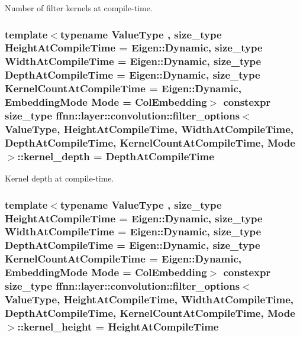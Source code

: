 Number of filter kernels at compile-\/time. 

\hypertarget{structffnn_1_1layer_1_1convolution_1_1filter__options_a3d16412aa799bd8a7357ea581dc33609}{
\subsubsection[{kernel\-\_\-depth}]{\setlength{\rightskip}{0pt plus 5cm}template$<$typename Value\-Type , size\-\_\-type Height\-At\-Compile\-Time = Eigen\-::\-Dynamic, size\-\_\-type Width\-At\-Compile\-Time = Eigen\-::\-Dynamic, size\-\_\-type Depth\-At\-Compile\-Time = Eigen\-::\-Dynamic, size\-\_\-type Kernel\-Count\-At\-Compile\-Time = Eigen\-::\-Dynamic, Embedding\-Mode Mode = Col\-Embedding$>$ constexpr {\bf size\-\_\-type} {\bf ffnn\-::layer\-::convolution\-::filter\-\_\-options}$<$ Value\-Type, Height\-At\-Compile\-Time, Width\-At\-Compile\-Time, Depth\-At\-Compile\-Time, Kernel\-Count\-At\-Compile\-Time, Mode $>$\-::kernel\-\_\-depth = Depth\-At\-Compile\-Time\hspace{0.3cm}{\ttfamily [static]}}}\label{structffnn_1_1layer_1_1convolution_1_1filter__options_a3d16412aa799bd8a7357ea581dc33609}


Kernel depth at compile-\/time. 

\hypertarget{structffnn_1_1layer_1_1convolution_1_1filter__options_a29ea922878c27749a2def9f843ccfaa6}{
\subsubsection[{kernel\-\_\-height}]{\setlength{\rightskip}{0pt plus 5cm}template$<$typename Value\-Type , size\-\_\-type Height\-At\-Compile\-Time = Eigen\-::\-Dynamic, size\-\_\-type Width\-At\-Compile\-Time = Eigen\-::\-Dynamic, size\-\_\-type Depth\-At\-Compile\-Time = Eigen\-::\-Dynamic, size\-\_\-type Kernel\-Count\-At\-Compile\-Time = Eigen\-::\-Dynamic, Embedding\-Mode Mode = Col\-Embedding$>$ constexpr {\bf size\-\_\-type} {\bf ffnn\-::layer\-::convolution\-::filter\-\_\-options}$<$ Value\-Type, Height\-At\-Compile\-Time, Width\-At\-Compile\-Time, Depth\-At\-Compile\-Time, Kernel\-Count\-At\-Compile\-Time, Mode $>$\-::kernel\-\_\-height = Height\-At\-Compile\-Time\hspace{0.3cm}{\ttfamily [static]}}}\label{structffnn_1_1layer_1_1convolution_1_1filter__options_a29ea922878c27749a2def9f843ccfaa6}



